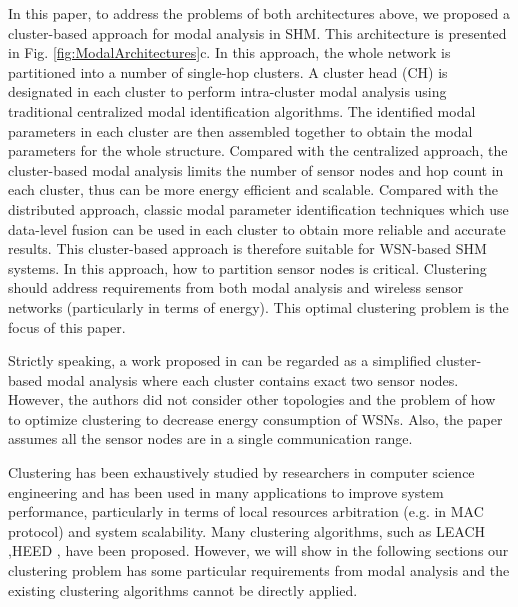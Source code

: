 In this paper, to address the problems of both architectures above, we proposed a cluster-based approach for modal analysis in SHM. This architecture is presented in Fig. \ref{fig:ModalArchitectures}c.  In this approach, the whole network is partitioned into a number of single-hop clusters. A cluster head (CH) is designated in each cluster to perform intra-cluster modal analysis using traditional centralized modal identification algorithms. The identified modal parameters in each cluster are then assembled together to obtain the modal parameters for the whole structure. Compared with the centralized approach, the cluster-based modal analysis limits the number of sensor nodes and hop count in each cluster, thus can be more energy efficient and scalable. Compared with the distributed approach, classic modal parameter identification techniques which use data-level fusion can be used in each cluster to obtain more reliable and accurate results. This cluster-based approach is therefore suitable for WSN-based SHM systems. In this approach, how to partition sensor nodes is critical. Clustering should address requirements from both modal analysis and wireless sensor networks (particularly in terms of energy). This optimal clustering problem is the focus of this paper.

Strictly speaking, a work proposed in \cite{zimmerman2008automated} can be regarded as a simplified cluster-based modal analysis where each cluster contains exact two sensor nodes. However, the authors did not consider other topologies and the problem of how to optimize clustering to decrease energy consumption of WSNs. Also, the paper assumes all the sensor nodes are in a single communication range. 


Clustering has been exhaustively studied by researchers in computer science engineering and has been used in many applications to improve system performance, particularly in terms of local resources arbitration (e.g. in MAC protocol) and system scalability.  Many clustering algorithms, such as LEACH \cite{leach},HEED \cite{iheed}, have been proposed. However, we will show in the following sections our clustering problem has some particular requirements from modal analysis and the existing clustering algorithms cannot be directly applied.